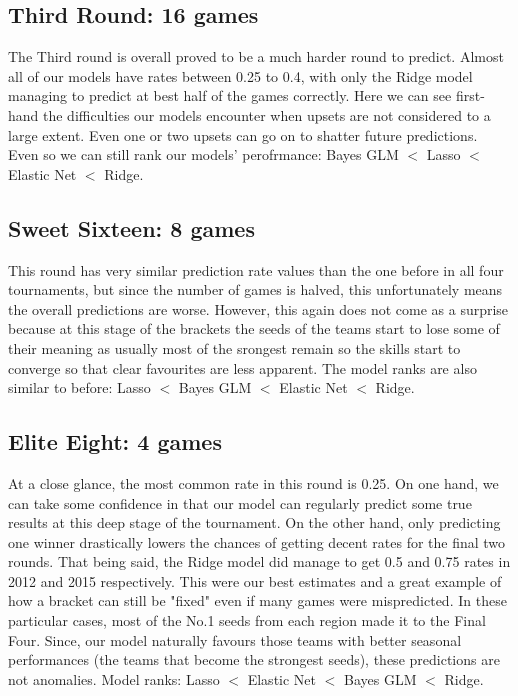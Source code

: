 \documentclass{article} %
\begin{document}
\subsection{Third Round: 16 games}

The Third round is overall proved to be a much harder round to predict. Almost all of our models have rates between 0.25 to 0.4, with only the Ridge model managing to predict at best half of the games correctly. Here we can see first-hand the difficulties our models encounter when upsets are not considered to a large extent. Even one or two upsets can go on to shatter future predictions. Even so we can still rank our models' perofrmance: Bayes GLM $<$ Lasso $<$ Elastic Net $<$ Ridge.

\subsection{Sweet Sixteen: 8 games}

This round has very similar prediction rate values than the one before in all four tournaments, but since the number of games is halved, this unfortunately means the overall predictions are worse. However, this again does not come as a surprise because at this stage of the brackets the seeds of the teams start to lose some of their meaning as usually most of the srongest remain so the skills start to converge so that clear favourites are less apparent. The model ranks are also similar to before: Lasso $<$ Bayes GLM $<$ Elastic Net $<$ Ridge.   

\subsection{Elite Eight: 4 games}

At a close glance, the most common rate in this round is 0.25. On one hand, we can take some confidence in that our model can regularly predict some true results at this deep stage of the tournament. On the other hand, only predicting one winner drastically lowers the chances of getting decent rates for the final two rounds. That being said, the Ridge model did manage to get 0.5 and 0.75 rates in 2012 and 2015 respectively. This were our best estimates and a great example of how a bracket can still be "fixed" even if many games were mispredicted. In these particular cases, most of the No.1 seeds from each region made it to the Final Four. Since, our model naturally favours those teams with better seasonal performances (the teams that become the strongest seeds), these predictions are not anomalies. Model ranks: Lasso  $<$ Elastic Net $<$ Bayes GLM $<$ Ridge.  
\end{document}
